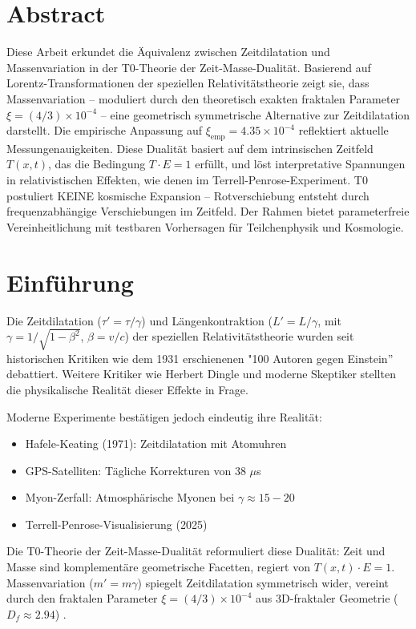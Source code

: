 \section*{Abstract}
		Diese Arbeit erkundet die Äquivalenz zwischen Zeitdilatation und Massenvariation in der T0-Theorie der Zeit-Masse-Dualität. Basierend auf Lorentz-Transformationen der speziellen Relativitätstheorie zeigt sie, dass Massenvariation – moduliert durch den theoretisch exakten fraktalen Parameter $\xi = (4/3) \times 10^{-4}$ – eine geometrisch symmetrische Alternative zur Zeitdilatation darstellt. Die empirische Anpassung auf $\xi_{\text{emp}} = 4.35 \times 10^{-4}$ reflektiert aktuelle Messungenauigkeiten. Diese Dualität basiert auf dem intrinsischen Zeitfeld $T(x,t)$, das die Bedingung $T \cdot E = 1$ erfüllt, und löst interpretative Spannungen in relativistischen Effekten, wie denen im Terrell-Penrose-Experiment. T0 postuliert KEINE kosmische Expansion – Rotverschiebung entsteht durch frequenzabhängige Verschiebungen im Zeitfeld. Der Rahmen bietet parameterfreie Vereinheitlichung mit testbaren Vorhersagen für Teilchenphysik und Kosmologie.

	
	\section{Einführung}
	Die Zeitdilatation ($\tau' = \tau / \gamma$) und Längenkontraktion ($L' = L / \gamma$, mit $\gamma = 1 / \sqrt{1 - \beta^2}$, $\beta = v/c$) der speziellen Relativitätstheorie wurden seit historischen Kritiken wie dem 1931 erschienenen "100 Autoren gegen Einstein'' \cite{hundert1931} debattiert. Weitere Kritiker wie Herbert Dingle \cite{dingle1972} und moderne Skeptiker \cite{gift2010} stellten die physikalische Realität dieser Effekte in Frage. 
	
	Moderne Experimente bestätigen jedoch eindeutig ihre Realität:
	\begin{itemize}
		\item Hafele-Keating (1971): Zeitdilatation mit Atomuhren \cite{hafele1972}
		\item GPS-Satelliten: Tägliche Korrekturen von 38 $\mu$s \cite{ashby2003}
		\item Myon-Zerfall: Atmosphärische Myonen bei $\gamma \approx 15-20$ \cite{rossi1941}
		\item Terrell-Penrose-Visualisierung (2025) \cite{terrell2025}
	\end{itemize}
	
	Die T0-Theorie der Zeit-Masse-Dualität \cite{pascher2025t0} reformuliert diese Dualität: Zeit und Masse sind komplementäre geometrische Facetten, regiert von $T(x,t) \cdot E = 1$. Massenvariation ($m' = m \gamma$) spiegelt Zeitdilatation symmetrisch wider, vereint durch den fraktalen Parameter $\xi = (4/3) \times 10^{-4}$ aus 3D-fraktaler Geometrie ($D_f \approx 2.94$) \cite{pascher2025si, mandelbrot1982}. 
	
